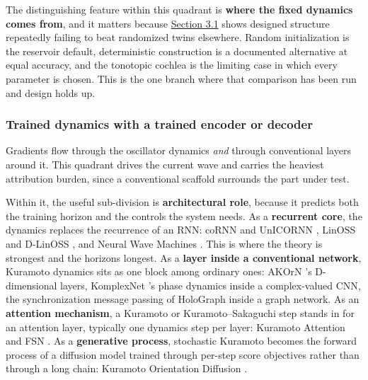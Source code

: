 \documentclass[a4paper,fleqn]{cas-sc}
\begin{document}
The distinguishing feature within this quadrant is \textbf{where the
fixed dynamics comes from}, and it matters because
\hyperref[sec-3-1]{Section 3.1} shows designed structure repeatedly
failing to beat randomized twins elsewhere. Random initialization is the
reservoir default, deterministic construction is a documented
alternative at equal accuracy, and the tonotopic cochlea is the limiting
case in which every parameter is chosen. This is the one branch where
that comparison has been run and design holds up.

\subsubsection{Trained dynamics with a trained encoder or
decoder}\label{sec-2-2-5}

Gradients flow through the oscillator dynamics \emph{and} through
conventional layers around it. This quadrant drives the current wave and
carries the heaviest attribution burden, since a conventional scaffold
surrounds the part under test.

Within it, the useful sub-division is \textbf{architectural role},
because it predicts both the training horizon and the controls the
system needs. As a \textbf{recurrent core}, the dynamics replaces the
recurrence of an RNN: coRNN \citep{rusch2021} and UnICORNN
\citep{unicornn}, LinOSS \citep{rusch2025} and D-LinOSS
\citep{d-linoss}, and Neural Wave Machines \citep{keller2023}. This is
where the theory is strongest and the horizons longest. As a
\textbf{layer inside a conventional network}, Kuramoto dynamics sits as
one block among ordinary ones: AKOrN \citep{akorn}'s D-dimensional
layers, KomplexNet \citep{muzellec2025}'s phase dynamics inside a
complex-valued CNN, the synchronization message passing of HoloGraph
\citep{dan2025} inside a graph network. As an \textbf{attention
mechanism}, a Kuramoto or Kuramoto--Sakaguchi step stands in for an
attention layer, typically one dynamics step per layer: Kuramoto
Attention \citep{kuramoto-attention} and FSN \citep{nunley2026}. As a
\textbf{generative process}, stochastic Kuramoto becomes the forward
process of a diffusion model trained through per-step score objectives
rather than through a long chain: Kuramoto Orientation Diffusion
\citep{kuramoto-orientation-diffusion}.
\end{document}
